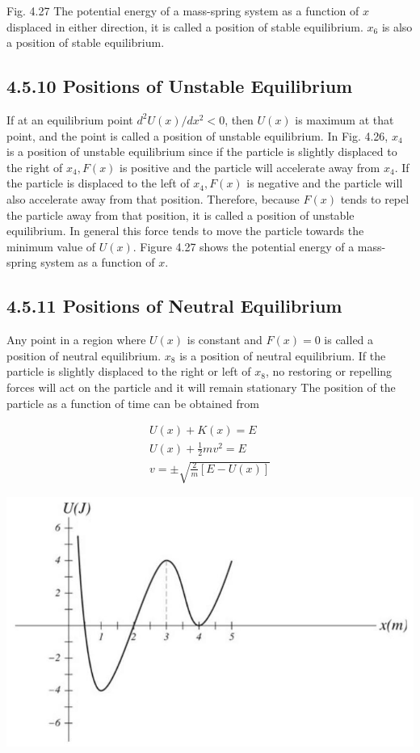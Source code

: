 \documentclass[10pt]{article}
\begin{document}
Fig. 4.27 The potential energy of a mass-spring system as a function of $x$\\
displaced in either direction, it is called a position of stable equilibrium. $x_{6}$ is also a position of stable equilibrium.

\subsection*{4.5.10 Positions of Unstable Equilibrium}
If at an equilibrium point $d^{2} U(x) / d x^{2}<0$, then $U(x)$ is maximum at that point, and the point is called a position of unstable equilibrium. In Fig. 4.26, $x_{4}$ is a position of unstable equilibrium since if the particle is slightly displaced to the right of $x_{4}, F(x)$ is positive and the particle will accelerate away from $x_{4}$. If the particle is displaced to the left of $x_{4}, F(x)$ is negative and the particle will also accelerate away from that position. Therefore, because $F(x)$ tends to repel the particle away from that position, it is called a position of unstable equilibrium. In general this force tends to move the particle towards the minimum value of $U(x)$. Figure 4.27 shows the potential energy of a mass-spring system as a function of $x$.

\subsection*{4.5.11 Positions of Neutral Equilibrium}
Any point in a region where $U(x)$ is constant and $F(x)=0$ is called a position of neutral equilibrium. $x_{8}$ is a position of neutral equilibrium. If the particle is slightly displaced to the right or left of $x_{8}$, no restoring or repelling forces will act on the particle and it will remain stationary The position of the particle as a function of time can be obtained from

$$
\begin{gathered}
U(x)+K(x)=E \\
U(x)+\frac{1}{2} m v^{2}=E \\
v= \pm \sqrt{\frac{2}{m}[E-U(x)]}
\end{gathered}
$$

\begin{center}
\includegraphics[max width=\textwidth]{2024_09_13_db1f357d2aad0a03eb2eg-078(1)}
\end{center}
\end{document}
